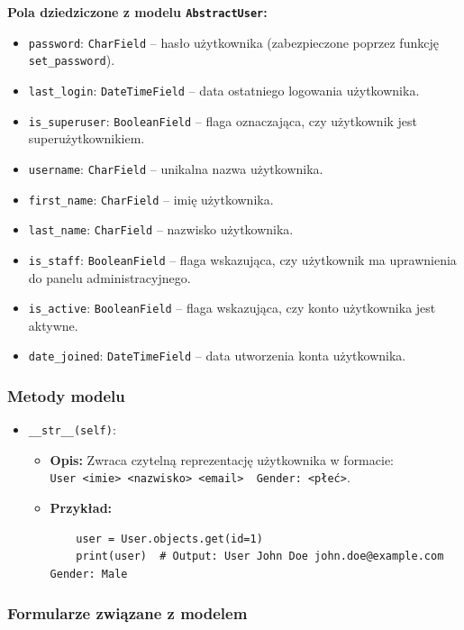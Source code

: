 \documentclass[12pt,a4paper,oneside]{article}
\theoremstyle{definition}
\numberwithin{equation}{section}
\begin{document}
\textbf{Pola dziedziczone z modelu \texttt{AbstractUser}:}
\begin{itemize}
    \item \texttt{password}: \texttt{CharField} – hasło użytkownika (zabezpieczone poprzez funkcję \texttt{set\_password}).
    \item \texttt{last\_login}: \texttt{DateTimeField} – data ostatniego logowania użytkownika.
    \item \texttt{is\_superuser}: \texttt{BooleanField} – flaga oznaczająca, czy użytkownik jest superużytkownikiem.
    \item \texttt{username}: \texttt{CharField} – unikalna nazwa użytkownika.
    \item \texttt{first\_name}: \texttt{CharField} – imię użytkownika.
    \item \texttt{last\_name}: \texttt{CharField} – nazwisko użytkownika.
    \item \texttt{is\_staff}: \texttt{BooleanField} – flaga wskazująca, czy użytkownik ma uprawnienia do panelu administracyjnego.
    \item \texttt{is\_active}: \texttt{BooleanField} – flaga wskazująca, czy konto użytkownika jest aktywne.
    \item \texttt{date\_joined}: \texttt{DateTimeField} – data utworzenia konta użytkownika.
\end{itemize}

\subsubsection*{Metody modelu}
\begin{itemize}
    \item \texttt{\_\_str\_\_(self)}:
    \begin{itemize}
        \item \textbf{Opis:} Zwraca czytelną reprezentację użytkownika w formacie: \\
        \texttt{User <imie> <nazwisko> <email> \ Gender: <płeć>}.
        \item \textbf{Przykład:}
        \begin{lstlisting}
    user = User.objects.get(id=1)
    print(user)  # Output: User John Doe john.doe@example.com Gender: Male
        \end{lstlisting}
    \end{itemize}
\end{itemize}

\subsubsection*{Formularze związane z modelem}
\end{document}

